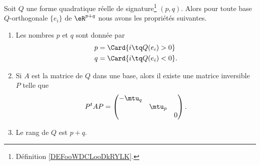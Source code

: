 \begin{theorem}   \label{ThoQFVsBCk}
    Soit $Q$ une forme quadratique réelle de signature\footnote{Définition \ref{DEFooWDCLooDkRYLK}.} \( (p,q)\). Alors pour toute base \( Q\)-orthogonale \( \{ e_i \}\) de \( \eR^{p+q}\) nous avons les propriétés suivantes.
    \begin{enumerate}
        \item       \label{ITEMooCFQHooRWfmpT}
            Les nombres \( p\) et \( q\) sont donnée par 
    \begin{subequations}
        \begin{align}
            p&=\Card\{ i\tq Q(e_i)>0 \}             \label{SUBEQooONWLooNsgmQY}   \\
            q&=\Card\{ i\tq Q(e_i)<0 \}.        \label{SUBEQooFKXMooOVwvKR}
        \end{align}
    \end{subequations}
\item       \label{ITEMooWLPVooSTOOjL}
    Si \( A\) est la matrice de \( Q\) dans une base, alors il existe une matrice inversible \( P\) telle que
    \begin{equation}
        P^tAP=\begin{pmatrix}
            -\mtu_q    &       &       \\
                &   \mtu_p    &       \\
                &       &   0
        \end{pmatrix}.
    \end{equation}
\item       \label{ITEMooGOHCooPrNQwm}
    Le rang de \( Q\) est \( p+q\).
    \end{enumerate}
\end{theorem}

